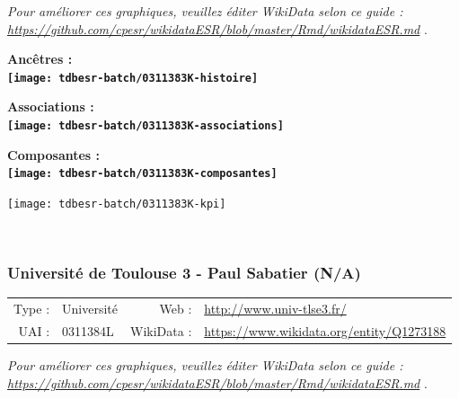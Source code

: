 \documentclass[12pt,french,]{article}
\begin{document}
\textit{\scriptsize Pour améliorer ces graphiques, veuillez éditer WikiData selon ce guide :  \href{https://github.com/cpesr/wikidataESR/blob/master/Rmd/wikidataESR.md}{https://github.com/cpesr/wikidataESR/blob/master/Rmd/wikidataESR.md}}
.

\vspace{1cm}  
\begin{minipage}[b]{0.50\textwidth}\begin{center} \bf Ancêtres : \\  
\texttt{[image: tdbesr-batch/0311383K-histoire]} \end{center}\end{minipage}\begin{minipage}[b]{0.50\textwidth}\begin{center} \bf Associations : \\  
\texttt{[image: tdbesr-batch/0311383K-associations]} \end{center}\end{minipage}

\hrulefill

\begin{center} \bf Composantes : \\  
\texttt{[image: tdbesr-batch/0311383K-composantes]} \end{center}

\begin{center}\texttt{[image: tdbesr-batch/0311383K-kpi]} \end{center}\checkoddpage

\ifoddpage \fi ~\newpage  

\hypertarget{universituxe9-de-toulouse-3---paul-sabatier-na}{%
\subsubsection{Université de Toulouse 3 - Paul Sabatier
(N/A)}\label{universituxe9-de-toulouse-3---paul-sabatier-na}}

\begin{tabular*}{\textwidth}{rp{5cm}rl}  
\hline  
Type : & Université & Web : &\href{http://www.univ-tlse3.fr/}{http://www.univ-tlse3.fr/} \\  
UAI : & 0311384L & WikiData : & \href{https://www.wikidata.org/entity/Q1273188}{https://www.wikidata.org/entity/Q1273188} \\  
\hline  
\end{tabular*}

\textit{\scriptsize Pour améliorer ces graphiques, veuillez éditer WikiData selon ce guide :  \href{https://github.com/cpesr/wikidataESR/blob/master/Rmd/wikidataESR.md}{https://github.com/cpesr/wikidataESR/blob/master/Rmd/wikidataESR.md}}
.
\end{document}
